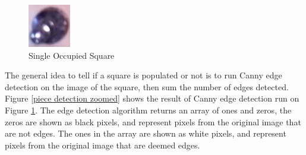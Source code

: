 \documentclass[journal]{IEEEtran}
\begin{document}
\begin{figure}[!ht]
	\centering
	\includegraphics[width=\linewidth]{Images/KnotDetection340Zoomed.jpg}
	\caption{Single Occupied Square}
	\label{piece zoomed}
\end{figure}

The general idea to tell if a square is populated or not is to run Canny edge detection on the image of the square, then sum the number of edges detected. Figure \ref{piece detection zoomed} shows the result of Canny edge detection run on Figure \ref{piece zoomed}. The edge detection algorithm returns an array of ones and zeros, the zeros are shown as black pixels, and represent pixels from the original image that are not edges. The ones in the array are shown as white pixels, and represent pixels from the original image that are deemed edges.
\end{document}

